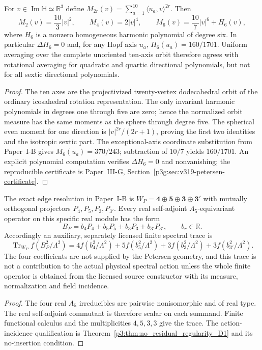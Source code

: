 \documentclass[12pt,a4paper]{article}
\begin{document}
\begin{theorem}
\label{p3b:thm:v319-petersen-moment-six}
For $v\in\operatorname{Im}\mathbb H\simeq\mathbb R^3$ define
$M_{2r}(v)=\sum_{a=1}^{10}\langle u_a,v\rangle^{2r}$.  Then
\[
 M_2(v)=\frac{10}{3}|v|^2,\qquad
 M_4(v)=2|v|^4,\qquad
 M_6(v)=\frac{10}{7}|v|^6+H_6(v),
\]
where $H_6$ is a nonzero homogeneous harmonic polynomial of degree
six.  In particular $\Delta H_6=0$ and, for any Hopf axis
$u_a$, $H_6(u_a)=160/1701$.  Uniform averaging over the complete
unoriented ten-axis orbit therefore agrees with rotational averaging
for quadratic and quartic directional polynomials, but not for all
sextic directional polynomials.
\end{theorem}
\begin{proof}
The ten axes are the projectivized twenty-vertex dodecahedral orbit
of the ordinary icosahedral rotation representation.  The only
invariant harmonic polynomials in degrees one through five are zero;
hence the normalized orbit measure has the same moments as the sphere
through degree five.  The spherical even moment for one direction is
$|v|^{2r}/(2r+1)$, proving the first two identities and the isotropic
sextic part.  The exceptional-axis coordinate substitution from Paper~I-B gives
$M_6(u_a)=370/243$; subtraction of $10/7$ yields $160/1701$.
An explicit polynomial computation verifies $\Delta H_6=0$ and
nonvanishing; the reproducible certificate is Paper~III-G,
Section~\ref{p3g:sec:v319-petersen-certificate}.
\end{proof}

\begin{proposition}
\label{p3b:prop:v319-petersen-four-coefficients}
The exact edge resolution in Paper~I-B is
$W_P=\mathbf4\oplus\mathbf5\oplus\mathbf3\oplus\mathbf3'$
with mutually orthogonal projectors $P_4,P_5,P_3,P_{3'}$.
Every real self-adjoint $A_5$-equivariant operator on this specific
real module has the form
\[
 B_P=b_4P_4+b_5P_5+b_3P_3+b_{3'}P_{3'},\qquad b_r\in\mathbb R.
\]
Accordingly an auxiliary, separately licensed finite spectral trace is
\[
 \operatorname{Tr}_{W_P}f(B_P^2/\Lambda^2)
 =4f(b_4^2/\Lambda^2)+5f(b_5^2/\Lambda^2)
  +3f(b_3^2/\Lambda^2)+3f(b_{3'}^2/\Lambda^2).
\]
The four coefficients are not supplied by the Petersen geometry, and
this trace is not a contribution to the actual physical spectral action
unless the whole finite operator is obtained from the licensed source
constructor with its measure, normalization and field incidence.
\end{proposition}
\begin{proof}
The four real $A_5$ irreducibles are pairwise nonisomorphic and of
real type.  The real self-adjoint commutant is therefore scalar on
each summand.  Finite functional calculus and the multiplicities
$4,5,3,3$ give the trace.  The action-incidence qualification is
Theorem~\ref{p3:thm:no_residual_regularity_D1} and its no-insertion
condition.
\end{proof}
\end{document}
